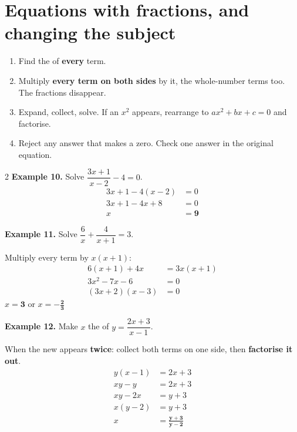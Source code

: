 \documentclass[11pt]{article}
\begin{document}
\section{Equations with fractions, and changing the subject}\label{h:solve}
\begin{keybox}[title={Write it in this order (solving)}]
\begin{enumerate}
\item Find the \Tlcd{} of \textbf{every} term.
\item Multiply \textbf{every term on both sides} by it, the whole-number terms too. The fractions disappear.
\item Expand, collect, solve. If an $x^{2}$ appears, rearrange to $ax^{2}+bx+c = 0$ and factorise.
\item Reject any answer that makes a \Tden{} zero. Check one answer in the original equation.
\end{enumerate}
\end{keybox}

\begin{multicols}{2}
\textbf{Example 10.} Solve $\dfrac{3x+1}{x-2} - 4 = 0$.
\begin{align*}
3x + 1 - 4(x-2) &= 0\\
3x + 1 - 4x + 8 &= 0\\
x &= \mathbf{9}
\end{align*}

\textbf{Example 11.} Solve $\dfrac{6}{x} + \dfrac{4}{x+1} = 3$.\par
Multiply every term by $x(x+1)$:
\begin{align*}
6(x+1) + 4x &= 3x(x+1)\\
3x^{2} - 7x - 6 &= 0\\
(3x+2)(x-3) &= 0
\end{align*}
$x = \mathbf{3}$ or $x = \mathbf{-\tfrac{2}{3}}$
\columnbreak

\textbf{Example 12.} Make $x$ the \Tsubject{} of $y = \dfrac{2x+3}{x-1}$.\par
When the new \Tsubject{} appears \textbf{twice}: collect both terms on one side, then \textbf{factorise it out}.
\begin{align*}
y(x-1) &= 2x+3\\
xy - y &= 2x + 3\\
xy - 2x &= y + 3\\
x(y-2) &= y+3\\
x &= \mathbf{\frac{y+3}{y-2}}
\end{align*}
\end{multicols}
\end{document}
